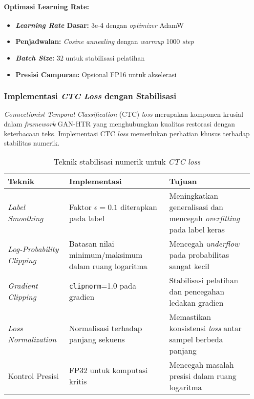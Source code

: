 \documentclass[12pt,a4paper]{article}
\begin{document}
\paragraph{Optimasi Learning Rate:}
\begin{itemize}[leftmargin=*, nosep]
\item \textbf{\textit{Learning Rate} Dasar:} 3e-4 dengan \textit{optimizer} AdamW
\item \textbf{Penjadwalan:} \textit{Cosine annealing} dengan \textit{warmup} 1000 \textit{step}
\item \textbf{\textit{Batch Size}:} 32 untuk stabilisasi pelatihan
\item \textbf{Presisi Campuran:} Opsional FP16 untuk akselerasi
\end{itemize}

\subsubsection{Implementasi \textit{CTC Loss} dengan Stabilisasi}
\textit{Connectionist Temporal Classification} (CTC) \textit{loss} merupakan komponen krusial dalam \textit{framework} GAN-HTR yang menghubungkan kualitas restorasi dengan keterbacaan teks. Implementasi CTC \textit{loss} memerlukan perhatian khusus terhadap stabilitas numerik.

\begin{table}[H]
\centering
\caption{Teknik stabilisasi numerik untuk \textit{CTC loss}}
\label{tab:ctc-stabilization}
\small
\begin{tabular}{|l|p{4.5cm}|p{6cm}|}
\hline
\textbf{Teknik} & \textbf{Implementasi} & \textbf{Tujuan} \\ \hline
\textit{Label Smoothing} & Faktor $\epsilon = 0.1$ diterapkan pada label & Meningkatkan generalisasi dan mencegah \textit{overfitting} pada label keras \\ \hline
\textit{Log-Probability Clipping} & Batasan nilai minimum/maksimum dalam ruang logaritma & Mencegah \textit{underflow} pada probabilitas sangat kecil \\ \hline
\textit{Gradient Clipping} & \texttt{clipnorm}=1.0 pada gradien & Stabilisasi pelatihan dan pencegahan ledakan gradien \\ \hline
\textit{Loss Normalization} & Normalisasi terhadap panjang sekuens & Memastikan konsistensi \textit{loss} antar sampel berbeda panjang \\ \hline
Kontrol Presisi & FP32 untuk komputasi kritis & Mencegah masalah presisi dalam ruang logaritma \\ \hline
\end{tabular}
\end{table}
\end{document}
